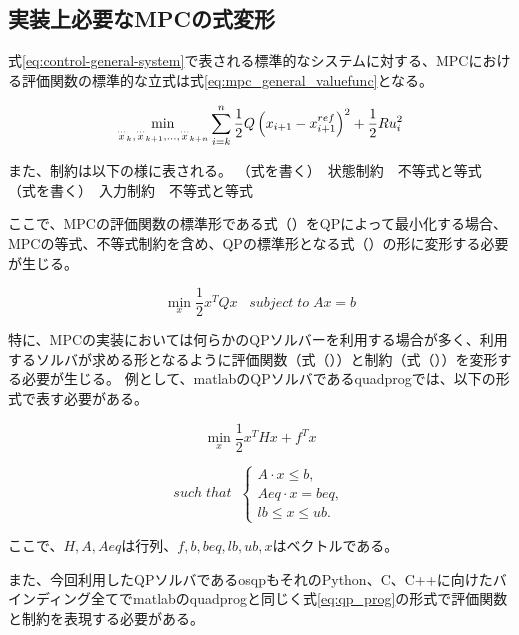 \subsection{実装上必要なMPCの式変形}
式\eqref{eq:control-general-system}で表される標準的なシステムに対する、MPCにおける評価関数の標準的な立式は式\eqref{eq:mpc_general_valuefunc}となる。

\begin{equation}
  \min_{{\buildrel\ldots\over{x}}_{k},{\buildrel\ldots\over{x}}_{k+1},\ldots,{\buildrel\ldots\over{x}}_{k+n}}\sum_{i=k}^{n}{1\over 2}Q\left(x_{i+1}-x_{i+1}^{ref}\right)^{2}+{1\over 2}R{u}_{i}^{2}
  \label{eq:mpc_general_valuefunc}
\end{equation}

また、制約は以下の様に表される。
（式を書く）　状態制約　不等式と等式
（式を書く）　入力制約　不等式と等式

ここで、MPCの評価関数の標準形である式（）をQPによって最小化する場合、MPCの等式、不等式制約を含め、QPの標準形となる式（）の形に変形する必要が生じる。

\begin{equation}
  \underset{x}{\min} \frac{1}{2}x^TQx \;\;\; subject \; to \; Ax = b
\end{equation}

特に、MPCの実装においては何らかのQPソルバーを利用する場合が多く、利用するソルバが求める形となるように評価関数（式（））と制約（式（））を変形する必要が生じる。
例として、matlab\cite{MATLAB:2021}のQPソルバであるquadprog\cite{MATLABQUADPLOG}では、以下の形式で表す必要がある。

\begin{equation}
  \underset{x}{\min} \frac{1}{2}x^THx + f^Tx
  \label{eq:qp_prog}
\end{equation}

\begin{equation}
  such \; that \;\;
  \begin{cases}
    A \cdot x \leq b,  \\
    Aeq \cdot x = beq, \\
    lb \leq x \leq ub.
  \end{cases}
  \label{eq:qp_constraint}
\end{equation}

ここで、$H,A,Aeq$は行列、$f,b,beq,lb,ub,x$はベクトルである。

また、今回利用したQPソルバであるosqp\cite{OSQP}もそれのPython、C、C++に向けたバインディング全てでmatlabのquadprogと同じく式\eqref{eq:qp_prog}の形式で評価関数と制約を表現する必要がある。

